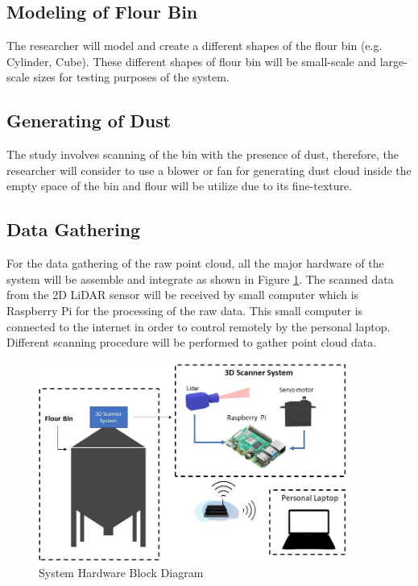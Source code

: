 \subsection{Modeling of Flour Bin}
\label{method:subsec:Modeling of Flour Bin}
The researcher will model and create a different shapes of the flour bin (e.g. Cylinder, Cube). These different shapes of flour bin will be small-scale and large-scale sizes for testing purposes of the system.

\subsection{Generating of Dust}
\label{method:subsec:Generating of Dust}
The study involves scanning of the bin with the presence of dust, therefore, the researcher will consider to use a blower or fan for generating dust cloud inside the empty space of the bin and flour will be utilize due to its fine-texture. 

\subsection{Data Gathering}
For the data gathering of the raw point cloud, all the major hardware of the system will be assemble and integrate as shown in Figure \ref{fig:System Hardware Block Diagram}. The scanned data from the 2D LiDAR sensor will be received by small computer which is Raspberry Pi for the processing of the raw data. This small computer is connected to the internet in order to control remotely by the personal laptop. Different scanning procedure will be performed to gather point cloud data.

\begin{figure}[H]
    \centering
    \includegraphics[width=0.9\textwidth]{Figures/system-hardware-block-diagram.jpg}
    \caption{System Hardware Block Diagram}
    \label{fig:System Hardware Block Diagram}
\end{figure}

